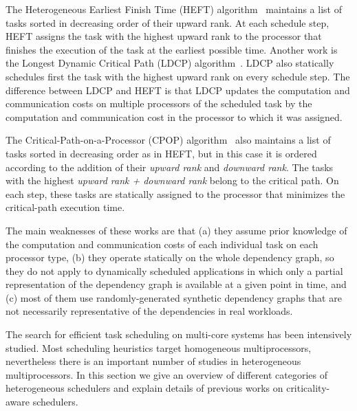 The Heterogeneous Earliest Finish Time (HEFT) algorithm~\cite{HEFT} maintains a list of tasks sorted in decreasing order of their upward rank. At each schedule step, HEFT assigns the task with the highest upward rank to the processor that finishes the execution of the task at the earliest possible time. Another work is the Longest Dynamic Critical Path (LDCP) algorithm~\cite{LDCP}. LDCP also statically schedules first the task with the highest upward rank on every schedule step. The difference between LDCP and HEFT is that LDCP updates the computation and communication costs on multiple processors of the scheduled task by the computation and communication cost in the processor to which it was assigned.

The Critical-Path-on-a-Processor (CPOP) algorithm~\cite{HEFT} also maintains a list of tasks sorted in decreasing order as in HEFT, but in this case it is ordered according to the addition of their \textit{upward rank} and \textit{downward rank}. The tasks with the highest \textit{upward rank + downward rank} belong to the critical path. On each step, these tasks are statically assigned to the processor that minimizes the critical-path execution time.


The main weaknesses of these works are that (a) they assume prior knowledge of the computation and communication costs of each individual task on each processor type, (b) they operate statically on the whole dependency graph, so they do not apply to dynamically scheduled applications in which only a partial representation of the dependency graph is available at a given point in time, and (c) most of them use randomly-generated synthetic dependency graphs that are not necessarily representative of the dependencies in real workloads.


The search for efficient task scheduling on multi-core systems has been intensively studied. Most scheduling heuristics target homogeneous multiprocessors, nevertheless there is an important number of studies in heterogeneous multiprocessors. In this section we give an overview of different categories of heterogeneous schedulers
and explain details of previous works on criticality-aware schedulers.

